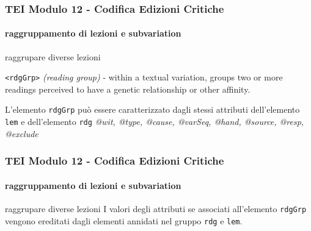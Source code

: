 \begin{frame}
    \frametitle{TEI Modulo 12 - Codifica Edizioni Critiche}
    \framesubtitle{raggruppamento di lezioni e subvariation}
    \addtocounter{nframe}{1}





   

    \begin{block}{raggrupare diverse lezioni}
        \item \texttt{<rdgGrp>} \textit{(reading group)} - within a textual variation, groups two or more readings perceived to have a genetic relationship or other affinity.
    \end{block}

    \begin{center}
       L'elemento \texttt{rdgGrp} può essere caratterizzato dagli stessi attributi dell'elemento \texttt{lem} e dell'elemento \texttt{rdg} \textit{@wit, @type, @cause, @varSeq, @hand, @source, @resp, @exclude}
    \end{center}

\end{frame}


\begin{frame}
    \frametitle{TEI Modulo 12 - Codifica Edizioni Critiche}
    \framesubtitle{raggruppamento di lezioni e subvariation}
    \addtocounter{nframe}{1}

   

    \begin{block}{raggrupare diverse lezioni}
        I valori degli attributi se associati all'elemento \texttt{rdgGrp} vengono ereditati dagli elementi annidati nel gruppo \texttt{rdg} e \texttt{lem}.
    \end{block}


\end{frame}

